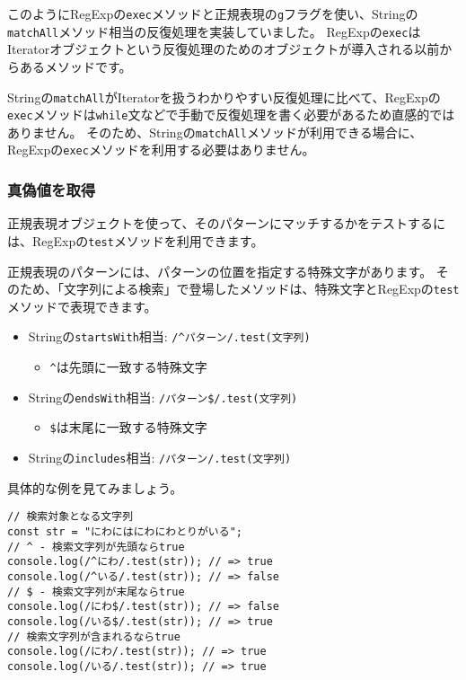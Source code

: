 \begin{tcolorbox}[enhanced jigsaw,breakable,title=RegExp.prototype.execでのString.prototype.matchAll]
このようにRegExpの\texttt{exec}メソッドと正規表現の\texttt{g}フラグを使い、Stringの\texttt{matchAll}メソッド相当の反復処理を実装していました。
RegExpの\texttt{exec}はIteratorオブジェクトという反復処理のためのオブジェクトが導入される以前からあるメソッドです。

Stringの\texttt{matchAll}がIteratorを扱うわかりやすい反復処理に比べて、RegExpの\texttt{exec}メソッドは\texttt{while}文などで手動で反復処理を書く必要があるため直感的ではありません。
そのため、Stringの\texttt{matchAll}メソッドが利用できる場合に、RegExpの\texttt{exec}メソッドを利用する必要はありません。
\end{tcolorbox}
\newpage
\hypertarget{test-by-regexp}{%
\subsubsection{真偽値を取得}\label{test-by-regexp}}

正規表現オブジェクトを使って、そのパターンにマッチするかをテストするには、RegExpの\texttt{test}メソッドを利用できます。

正規表現のパターンには、パターンの位置を指定する特殊文字があります。
そのため、「文字列による検索」で登場したメソッドは、特殊文字とRegExpの\texttt{test}メソッドで表現できます。

\begin{itemize}
\item
  Stringの\texttt{startsWith}相当:
  \texttt{/\^{}パターン/.test(文字列)}

  \begin{itemize}
  \item
    \texttt{\^{}}は先頭に一致する特殊文字
  \end{itemize}
\item
  Stringの\texttt{endsWith}相当:
  \texttt{/パターン\$/.test(文字列)}

  \begin{itemize}
  \item
    \texttt{\$}は末尾に一致する特殊文字
  \end{itemize}
\item
  Stringの\texttt{includes}相当:
  \texttt{/パターン/.test(文字列)}
\end{itemize}

具体的な例を見てみましょう。

\begin{lstlisting}
// 検索対象となる文字列
const str = "にわにはにわにわとりがいる";
// ^ - 検索文字列が先頭ならtrue
console.log(/^にわ/.test(str)); // => true
console.log(/^いる/.test(str)); // => false
// $ - 検索文字列が末尾ならtrue
console.log(/にわ$/.test(str)); // => false
console.log(/いる$/.test(str)); // => true
// 検索文字列が含まれるならtrue
console.log(/にわ/.test(str)); // => true
console.log(/いる/.test(str)); // => true
\end{lstlisting}

